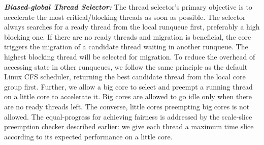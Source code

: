 
\textbf{\textit{Biased-global Thread Selector:}}
The thread selector's primary objective is to accelerate the most critical/blocking threads as soon as possible. The selector always searches for a ready thread from the local runqueue first, preferably a high blocking one. If there are no ready threads and migration is beneficial, the core triggers the migration of a candidate thread waiting in another runqueue. The highest blocking thread will be selected for migration.
To reduce the overhead of accessing state in other runqueues, we follow the same principle as the default Linux CFS scheduler, returning the best candidate thread from the local core group first.
Further, we allow a big core to select and preempt a running thread on a little core to accelerate it. Big cores are allowed to go idle only when there are no ready threads left. The converse, little cores preempting big cores is not allowed. 
The equal-progress for achieving fairness is addressed by the scale-slice preemption checker described earlier: we give each thread a maximum time slice according to its expected performance on a little core.




